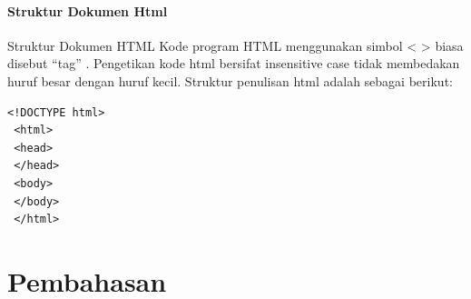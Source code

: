 \documentclass[a4paper,12pt]{article}
\begin{document}
\paragraph{Struktur Dokumen Html\\}
Struktur Dokumen HTML
Kode program HTML menggunakan simbol < > biasa disebut “tag” . Pengetikan kode
html bersifat insensitive case tidak membedakan huruf besar dengan huruf kecil.
Struktur penulisan html adalah sebagai berikut:
\begin{lstlisting}[frame=single,language=HTML5]
 <!DOCTYPE html>
 <html>
 <head>
 </head>
 <body>
 </body>
 </html>
\end{lstlisting}

\section{Pembahasan}
\end{document}
